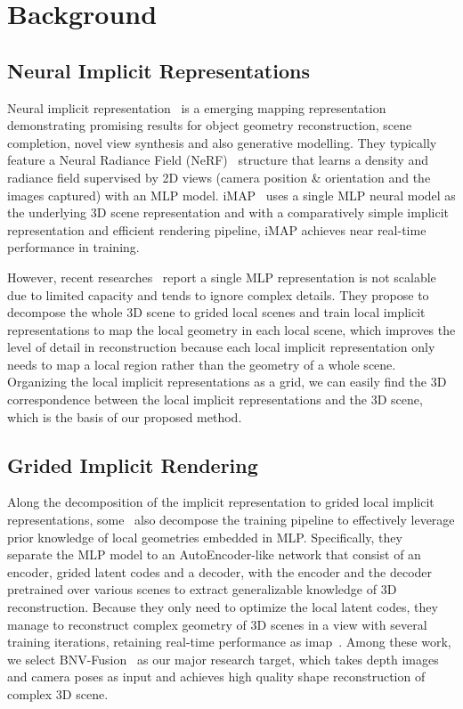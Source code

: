 \section{Background\label{background}}
\subsection{Neural Implicit Representations}
Neural implicit representation~\cite{mildenhall_nerf_2020,sucar_imap_2021,li_bnv-fusion_2022,zhu_nice-slam_2022,jin_neu-nbv_2023} is a emerging mapping representation demonstrating promising results for object geometry reconstruction, scene completion, novel view synthesis and also generative modelling.
They typically feature a Neural Radiance Field (NeRF)~\cite{mildenhall_nerf_2020} structure that learns a density and radiance field supervised by 2D views (camera position \& orientation and the images captured) with an MLP model.
iMAP~\cite{sucar_imap_2021} uses a single MLP neural model as the underlying 3D scene representation and with a comparatively simple implicit representation and efficient rendering pipeline, iMAP achieves near real-time performance in training.

However, recent researches~\cite{chabra2020deep,9156855,genova2020local,li_bnv-fusion_2022,zhu_nice-slam_2022} report a single MLP representation is not scalable due to limited capacity and tends to ignore complex details.
They propose to decompose the whole 3D scene to grided local scenes and train local implicit representations to map the local geometry in each local scene, 
which improves the level of detail in reconstruction because each local implicit representation only needs to map a local region rather than the geometry of a whole scene.
Organizing the local implicit representations as a grid, we can easily find the 3D correspondence between the local implicit representations and the 3D scene, which is the basis of our proposed method.

\subsection{Grided Implicit Rendering}
Along the decomposition of the implicit representation to grided local implicit representations, some~\cite{li_bnv-fusion_2022,zhu_nice-slam_2022} also decompose the training pipeline to effectively leverage prior knowledge of local geometries embedded in MLP.
Specifically, they~\cite{li_bnv-fusion_2022,zhu_nice-slam_2022} separate the MLP model to an AutoEncoder-like network that consist of an encoder, grided latent codes and a decoder, with the encoder and the decoder pretrained over various scenes to extract generalizable knowledge of 3D reconstruction.
Because they only need to optimize the local latent codes, they manage to reconstruct complex geometry of 3D scenes in a view with several training iterations, retaining real-time performance as imap~\cite{sucar_imap_2021}.
Among these work, we select BNV-Fusion~\cite{li_bnv-fusion_2022} as our major research target, which takes depth images and camera poses as input and achieves high quality shape reconstruction of complex 3D scene.

